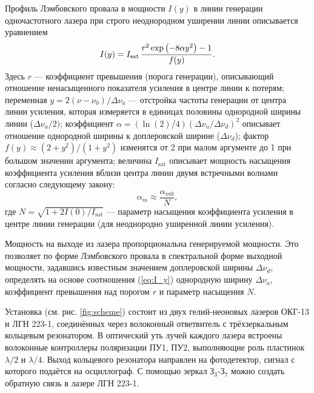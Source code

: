\documentclass[12pt, russian, a4paper]{article}
\begin{document}
	Профиль Лэмбовского провала в мощности $I(y)$ в линии генерации одночастотного лазера при строго неоднородном уширении линии описывается уравнением
	\begin{equation}\label{eq:I_y}
		I(y) = I_\text{sat}\, \dfrac{r^2 \exp\qty(-8\alpha y^2) - 1}{f(y)}.
	\end{equation}
	Здесь $r$ --- коэффициент превышения (порога генерации), описывающий отношение ненасыщенного показателя усиления в центре линии к потерям; переменная $y = 2 (\nu-\nu_0)/\Delta\nu_a$ --- отстройка частоты генерации от центра линии усиления, которая измеряется в единицах половины однородной ширины линии ($\Delta\nu_a/2)$; коэффициент $\alpha=(\ln(2) / 4)(\Delta\nu_a / \Delta\nu_d)^2$ описывает отношение однородной ширины к доплеровской ширине ($\Delta\nu_d$); фактор $f(y) \approx (2+y^2)/ (1+y^2)$ изменятся от 2 при малом аргументе до 1 при большом значении аргумента; величина $I_\text{sat}$ описывает мощность насыщения коэффициента усиления вблизи центра линии двумя встречными волнами согласно следующему закону:
	\begin{equation}
		\alpha_m \approx \dfrac{\alpha_{m0}}{N},
	\end{equation}
	где $N = \sqrt{1 + 2I(0)/I_\text{sat}}$ --- параметр насыщения коэффициента усиления в центре линии генерации (для неоднородно уширенной линии усиления).

	Мощность на выходе из лазера пропорциональна генерируемой мощности. Это позволяет по форме Лэмбовского провала в спектральной форме выходной мощности, задавшись известным значением доплеровской ширины $\Delta\nu_d$, определять на основе соотношения (\ref{eq:I_y}) однородную ширину $\Delta\nu_a$, коэффициент превышения над порогом $r$ и параметр насыщения $N$.



	Установка (см. рис. \ref{fig:scheme}) состоит из двух гелий-неоновых лазеров ОКГ-13 и ЛГН 223-1, соединённых через волоконный ответвитель с трёхзеркальным кольцевым резонатором. В оптический  уть лучей каждого лазера встроены волоконные контроллеры поляризации ПУ1, ПУ2, выполняющие роль пластинок $\lambda/2$ и $\lambda/4$. Выход кольцевого резонатора направлен на фотодетектор, сигнал с которого подаётся на осциллограф. С помощью зеркал $\text{З}_3\text{-З}_7$ можно создать обратную связь в лазере ЛГН 223-1.
\end{document}
